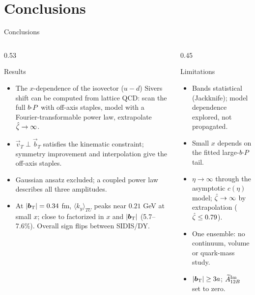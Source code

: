 \section{Conclusions}

\begin{frame}{Conclusions}
  \begin{columns}[t]
    \begin{column}{0.53\textwidth}
      \begin{block}{Results}
        \begin{itemize}
          \item The $x$-dependence of the isovector ($u-d$) Sivers shift can be computed from lattice QCD: scan the full $b{\cdot} P$ with off-axis staples, model with a Fourier-transformable power law, extrapolate ${\hat \zeta}\to\infty$.
          \item $\vec v_T\perp\vec b_T$ satisfies the kinematic constraint; symmetry improvement and interpolation give the off-axis staples.
          \item Gaussian ansatz excluded; a coupled power law describes all three amplitudes.
          \item At $|\boldsymbol{b}_{\mathrm T}|=0.34$ fm, $\langle k_y\rangle_{TU}$ peaks near $0.21$ GeV at small $x$; close to factorized in $x$ and $|\boldsymbol{b}_{\mathrm T}|$ (5.7--7.6\%). Overall sign flips between SIDIS/DY.
        \end{itemize}
      \end{block}
    \end{column}
    \begin{column}{0.45\textwidth}
      \begin{alertblock}{Limitations}
        \begin{itemize}
          \item Bands statistical (Jackknife); model dependence explored, not propagated.
          \item Small $x$ depends on the fitted large-$b{\cdot} P$ tail.
          \item $\eta\to\infty$ through the asymptotic $c(\eta)$ model; ${\hat \zeta}\to\infty$ by extrapolation (${\hat \zeta}\le0.79$).
          \item One ensemble: no continuum, volume or quark-mass study.
          \item $|\boldsymbol{b}_{\mathrm T}|\ge 3a$; $\widetilde{A}_{12B}^{\text{Im}}$ set to zero.
        \end{itemize}
      \end{alertblock}
    \end{column}
  \end{columns}
\end{frame}

